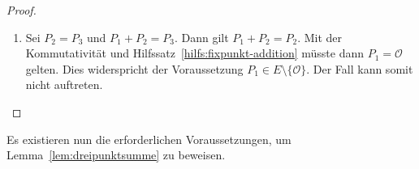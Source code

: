 \begin{proof}
\begin{enumerate}
\[              \]
              folgt
              \[
                  m(P_2,P_3)-m(P_1,P_2)
                  =
                  \frac{(x_3-x_1)(x_3-\hat{x})}{2y_3}.
              \]
              Die Gleichung kann mit der Definition \(c_2 = \frac{m(P_1,P_2)-m(P_2,P_3)}{x_1-x_3}\) umgeformt werden zu
              \begin{align*}
                  c_2
                   & = \frac{m(P_1,P_2)-m(P_2,P_3)}{x_1-x_3}       \\
                   & = \frac{m(P_2,P_3)-m(P_1,P_2)}{x_3-x_1}       \\
                   & =\frac{(x_3-x_1)(x_3-\hat{x})}{2y_3(x_3-x_1)} \\
                   & =\frac{x_3-\hat{x}}{2y_3}.
              \end{align*}
              Damit folgt
              \[
                  c_2(m_{12}+m_{12,3})
                  =
                  \frac{x_3-\hat{x}}{2y_3}
                  \cdot
                  \frac{2y_3}{x_3-\hat{x}}
                  =
                  1.
              \]
        \item Sei $P_2=P_3$ und $P_1+P_2=P_3$. Dann gilt \(P_1+P_2=P_2\). Mit der Kommutativität und Hilfssatz~\ref{hilfs:fixpunkt-addition} müsste dann $P_1=\mathcal{O}$ gelten. Dies widerspricht der Voraussetzung $P_1\in E\setminus\{\mathcal{O}\}$. Der Fall kann somit nicht auftreten.
    \end{enumerate}
\end{proof}
Es existieren nun die erforderlichen Voraussetzungen, um Lemma~\ref{lem:dreipunktsumme} zu beweisen.
